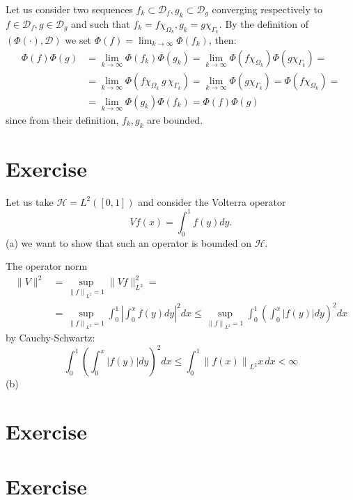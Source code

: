 \documentclass{article}
\begin{document}
Let us consider two sequences $f_k \subset \mathcal{D}_f, g_k \subset \mathcal{D}_g$ converging respectively to $f \in \mathcal{D}_f, g \in \mathcal{D}_g$ and such that $f_k = f \chi_{\Omega_k}, g_k = g \chi_{\Gamma_k}$. By the definition of $(\Phi(\cdot), \mathcal{D})$ we set $\Phi(f) = \lim_{k \to \infty} \Phi(f_k)$, then:
\[
    \begin{split}
        \Phi(f) \Phi(g) &= \lim_{k \to \infty} \Phi(f_k) \Phi(g_k) = \lim_{k \to \infty} \Phi(f\chi_{\Omega_k}) \Phi(g \chi_{\Gamma_k}) =\\
        & = \lim_{k \to \infty} \Phi(f\chi_{\Omega_k}\, g\, \chi_{\Gamma_k}) = \lim_{k \to \infty}  \Phi(g \chi_{\Gamma_k}) =  \Phi(f\chi_{\Omega_k}) =\\
        &= \lim_{k \to \infty}  \Phi(g_k) \Phi(f_k) = \Phi(f) \Phi(g)
    \end{split}
\]
since from their definition, $f_k, g_k$ are bounded.
\section{Exercise}

Let us take $\mathcal{H} = L^2([0,1])$ and consider the Volterra operator
\[
    Vf(x) = \int_0^1 f(y) dy.
\]
(a) we want to show that such an operator is bounded on $\mathcal{H}$.

The operator norm
\[
    \begin{split}
        \| V \|^2 &= \sup_{{\| f \|}_{L^2} = 1} \|Vf \|_{L^2}^2 =\\
        &= \sup_{{\| f \|}_{L^2} = 1} \int_{0}^{1} \left| \int_{0}^{x} f(y) dy \right|^2 dx \leq  \sup_{{\| f \|}_{L^2} = 1} \int_{0}^{1} {\left( \int_{0}^{x} |f(y)| dy \right)}^2 dx
    \end{split}
\]
by Cauchy-Schwartz:
\[
    \int_{0}^{1} {\left( \int_{0}^{x} |f(y)| dy \right)}^2 dx \leq \int_{0}^{1} {\|f(x)\|}_{L^2} x\, dx < \infty
\]
(b)
\section{Exercise}
\section{Exercise}
\end{document}
